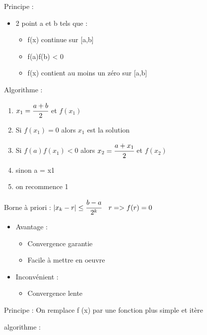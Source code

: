 \hformbar



Principe :

\begin{itemize}
    \item 2 point a et b tels que :
    \begin{itemize}
        \item f(x) continue sur [a,b]
        \item f(a)f(b) < 0
        \item f(x) contient au moins un zéro sur [a,b]
    \end{itemize}
\end{itemize}

Algorithme : 
\begin{enumerate}
    \item $x_1 = \cfrac{a+b}{2}$ et $f(x_1)$
    \item Si $f(x_1) = 0$ alors $x_1$ est la solution
    \item Si $f(a)f(x_1) < 0$ alors $x_2 = \cfrac{a+x_1}{2}$ et $f(x_2)$
    \item sinon a = x1 
    \item on recommence 1
\end{enumerate}

Borne à priori : $|x_k - r| \leq \cfrac{b-a}{2^k} \quad r => f(r) = 0$


\begin{itemize}
    \item Avantage : 
    \begin{itemize}
        \item Convergence garantie
        \item Facile à mettre en oeuvre
    \end{itemize}
    \item Inconvénient : 
    \begin{itemize}
        \item Convergence lente
    \end{itemize}
\end{itemize}


Principe :
On remplace f (x) par une fonction plus simple et itère

algorithme :

